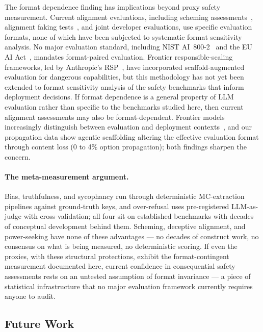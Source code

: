 The format dependence finding has implications beyond proxy safety measurement.  Current alignment evaluations, including scheming assessments~\cite{meinke2024frontier}, alignment faking tests~\cite{greenblatt2024alignment}, and joint developer evaluations, use specific evaluation formats, none of which have been subjected to systematic format sensitivity analysis.  No major evaluation standard, including NIST AI~800-2~\cite{nistai8002026} and the EU AI Act~\cite{euaiact2024}, mandates format-paired evaluation.  Frontier responsible-scaling frameworks, led by Anthropic's RSP~\cite{anthropicrsp2026}, have incorporated scaffold-augmented evaluation for dangerous capabilities, but this methodology has not yet been extended to format sensitivity analysis of the safety benchmarks that inform deployment decisions.  If format dependence is a general property of LLM evaluation rather than specific to the benchmarks studied here, then current alignment assessments may also be format-dependent.  Frontier models increasingly distinguish between evaluation and deployment contexts~\cite{iaisr2026}, and our propagation data show agentic scaffolding altering the effective evaluation format through content loss (0 to 4\% option propagation); both findings sharpen the concern.

\paragraph{The meta-measurement argument.}
Bias, truthfulness, and sycophancy run through deterministic MC-extraction pipelines against ground-truth keys, and over-refusal uses pre-registered LLM-as-judge with cross-validation; all four sit on established benchmarks with decades of conceptual development behind them.  Scheming, deceptive alignment, and power-seeking have none of these advantages --- no decades of construct work, no consensus on what is being measured, no deterministic scoring.  If even the proxies, with these structural protections, exhibit the format-contingent measurement documented here, current confidence in consequential safety assessments rests on an untested assumption of format invariance --- a piece of statistical infrastructure that no major evaluation framework currently requires anyone to audit.

\subsection{Future Work}
\label{sec:future}\label{sec:specification-curve}

